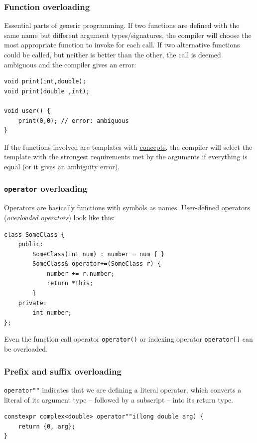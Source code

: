 \documentclass[table, xcdraw]{article}%
\begin{document}
\subsubsection{Function overloading}
Essential parts of generic programming. If two functions are defined with the same name but different argument types/signatures, the compiler will choose the most appropriate function to invoke for each call. If two alternative functions could be called, but neither is better than the other, the call is deemed ambiguous and the compiler gives an error:

\begin{verbatim}
void print(int,double);
void print(double ,int);

void user() {
    print(0,0); // error: ambiguous
}
\end{verbatim}

If the functions involved are templates with \hyperref[concepts]{concepts}, the compiler will select the template with the strongest requirements met by the arguments if everything is equal (or it gives an ambiguity error).

\subsubsection{\texttt{operator} overloading}

Operators are basically functions with symbols as names. User-defined operators (\textit{overloaded operators}) look like this:

\begin{verbatim}
class SomeClass {
    public:
        SomeClass(int num) : number = num { }
        SomeClass& operator+=(SomeClass r) {
            number += r.number;
            return *this;
        }
    private:
        int number;
};
\end{verbatim}

Even the function call operator \texttt{operator()} or indexing operator \texttt{operator[]} can be overloaded.

\subsubsection{Prefix and suffix overloading}

\texttt{operator""} indicates that we are defining a literal operator, which converts a literal of its argument type -- followed by a subscript -- into its return type.

\begin{verbatim}
constexpr complex<double> operator""i(long double arg) {
    return {0, arg};
}
\end{verbatim}
\end{document}
